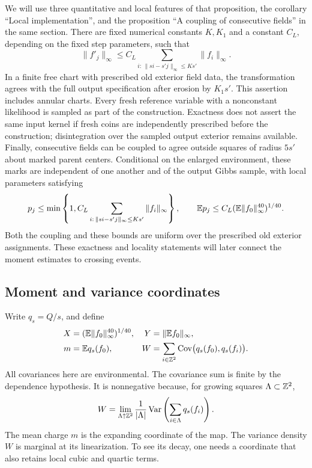 We will use three quantitative and local features of that proposition,
the corollary ``Local implementation'', and the proposition ``A coupling
of consecutive fields'' in the same section.  There are
fixed numerical constants \(K,K_1\) and a constant \(C_L\), depending
on the fixed step parameters, such that
\begin{equation}
 \|f'_j\|_\infty\le C_L
 \sum_{i:\,\|si-s'j\|_\infty\le Ks'}\|f_i\|_\infty.
 \label{eq:raw-scale-bound}
\end{equation}
In a finite free chart with prescribed old exterior field data, the
transformation agrees with the full output specification after erosion
by \(K_1s'\).  This assertion includes annular charts.  Every fresh
reference variable with a nonconstant likelihood is sampled as part of
the construction.  Exactness does not assert the same input kernel if
fresh coins are independently prescribed before the construction;
disintegration over the sampled output exterior remains available.
Finally, consecutive fields can be
coupled to agree outside squares of radius \(5s'\) about marked parent
centers.  Conditional on the enlarged environment, these marks are
independent of one another and of the output Gibbs sample, with local
parameters satisfying
\begin{equation}
 p_j\le \min\left\{1,C_L
 \sum_{i:\,\|si-s'j\|_\infty\le Ks'}\|f_i\|_\infty\right\},
 \qquad \mathbb E p_j\le C_L(\mathbb E\|f_0\|_\infty^{40})^{1/40}.
 \label{eq:scale-marks}
\end{equation}
Both the coupling and these bounds are uniform over the prescribed old
exterior assignments.  These exactness and locality statements will
later connect the moment estimates to crossing events.

\subsection{Moment and variance coordinates}

Write \(q_s=Q/s\), and define
\begin{equation}
 \begin{aligned}
 X&=(\mathbb E\|f_0\|_\infty^{40})^{1/40},
 &Y&=\|\mathbb E f_0\|_\infty,\\
 m&=\mathbb E q_s(f_0),
 &W&=\sum_{i\in\mathbb Z^2}\operatorname{Cov}\bigl(q_s(f_0),q_s(f_i)\bigr).
 \end{aligned}
 \label{eq:scale-coordinates}
\end{equation}
All covariances here are environmental.  The covariance sum is finite
by the dependence hypothesis.  It is nonnegative because, for growing
squares \(\Lambda\subset\mathbb Z^2\),
\[
 W=\lim_{\Lambda\uparrow\mathbb Z^2}\frac1{|\Lambda|}
       \operatorname{Var}\left(\sum_{i\in\Lambda}q_s(f_i)\right).
\]
The mean charge \(m\) is the expanding coordinate of the map.  The
variance density \(W\) is marginal at its linearization.  To see its
decay, one needs a coordinate that also retains local cubic and quartic
terms.

